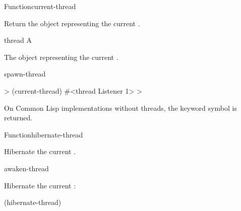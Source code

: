 \begin{functiondoc}{Function}{current-thread}{\noargs{} 
    \returns{} }
%

\fnsyntax

\fnpurpose Return the object representing the current .

\fnpackage {}

\fnmodule {}

\fnargs
\begin{args}{thread}
\arg[thread] A 
\end{args}

\fnreturns The object representing the current . 

\begin{alsos}{spawn-thread}
\end{alsos}

\fnexample
%
\W\supp
\begin{example}
  > (current-thread)
  #<thread Listener 1>
  >
\end{example}

\fnnote On Common Lisp implementations without threads,
the keyword symbol  is returned.

\end{functiondoc}


\begin{functiondoc}{Function}{hibernate-thread}{\noargs{}}
%

\fnsyntax

\fnpurpose Hibernate the current .

\fnpackage {}

\fnmodule {}

\fnerrors
\nothreads{}

\begin{alsos}{awaken-thread}
\end{alsos}

\fnexample
Hibernate the current :
%
\W\supp
\begin{example}
  (hibernate-thread)
\end{example}

\end{functiondoc}

